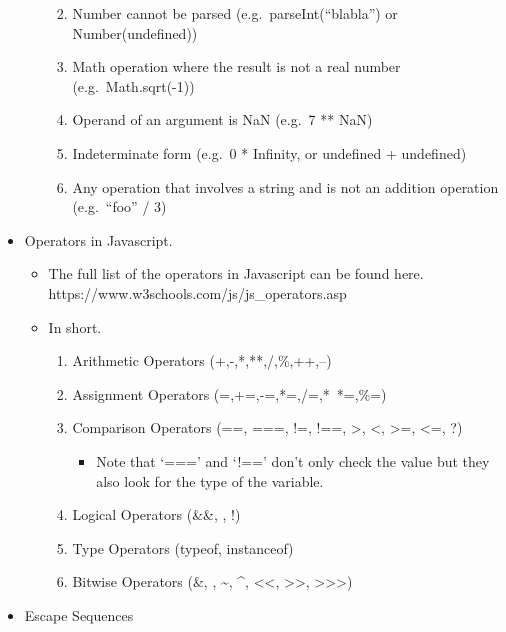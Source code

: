 \documentclass[
  paper=a4,
  ,captions=tableheading
]{scrartcl}
\providecommand{\tightlist}{%
  \setlength{\itemsep}{0pt}\setlength{\parskip}{0pt}}
\begin{document}
\begin{itemize}
\begin{enumerate}
    \begin{enumerate}
    \def\labelenumii{\arabic{enumii}.}
    \tightlist
    \item
      Number cannot be parsed (e.g.~parseInt(``blabla'') or
      Number(undefined))
    \item
      Math operation where the result is not a real number
      (e.g.~Math.sqrt(-1))
    \item
      Operand of an argument is NaN (e.g.~7 ** NaN)
    \item
      Indeterminate form (e.g.~0 * Infinity, or undefined + undefined)
    \item
      Any operation that involves a string and is not an addition
      operation (e.g.~``foo'' / 3)
    \end{enumerate}
  \end{enumerate}
\item
  Operators in Javascript.

  \begin{itemize}
  \tightlist
  \item
    The full list of the operators in Javascript can be found here.
    https://www.w3schools.com/js/js\_operators.asp
  \item
    In short.

    \begin{enumerate}
    \def\labelenumi{\arabic{enumi}.}
    \tightlist
    \item
      Arithmetic Operators (+,-,*,**,/,\%,++,--)
    \item
      Assignment Operators (=,+=,-=,*=,/=,*~*=,\%=)
    \item
      Comparison Operators (==, ===, !=, !==, \textgreater, \textless,
      \textgreater=, \textless=, ?)

      \begin{itemize}
      \tightlist
      \item
        Note that `===' and `!==' don't only check the value but they
        also look for the type of the variable.
      \end{itemize}
    \item
      Logical Operators (\&\&, \textbar\textbar, !)
    \item
      Type Operators (typeof, instanceof)
    \item
      Bitwise Operators (\&, \textbar, \textasciitilde, \^{},
      \textless\textless, \textgreater\textgreater,
      \textgreater\textgreater\textgreater)
    \end{enumerate}
  \end{itemize}
\item
  Escape Sequences


\end{itemize}
\end{document}
